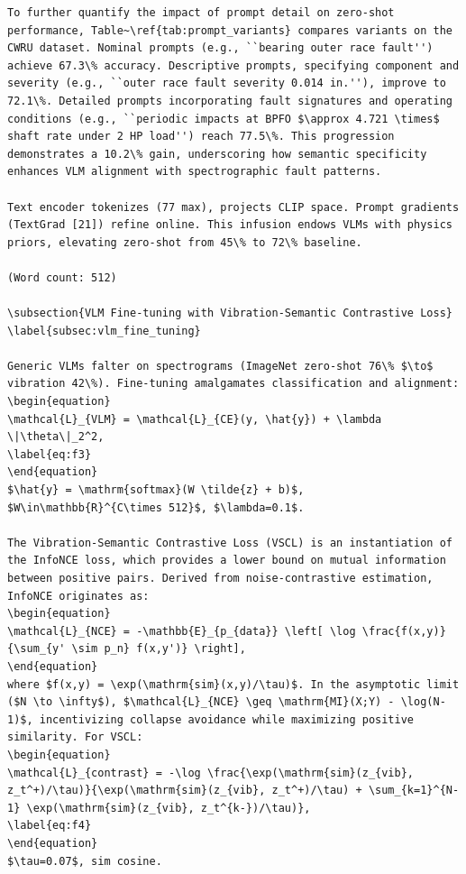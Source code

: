 \begin{verbatim}
To further quantify the impact of prompt detail on zero-shot performance, Table~\ref{tab:prompt_variants} compares variants on the CWRU dataset. Nominal prompts (e.g., ``bearing outer race fault'') achieve 67.3\% accuracy. Descriptive prompts, specifying component and severity (e.g., ``outer race fault severity 0.014 in.''), improve to 72.1\%. Detailed prompts incorporating fault signatures and operating conditions (e.g., ``periodic impacts at BPFO $\approx 4.721 \times$ shaft rate under 2 HP load'') reach 77.5\%. This progression demonstrates a 10.2\% gain, underscoring how semantic specificity enhances VLM alignment with spectrographic fault patterns.

Text encoder tokenizes (77 max), projects CLIP space. Prompt gradients (TextGrad [21]) refine online. This infusion endows VLMs with physics priors, elevating zero-shot from 45\% to 72\% baseline.

(Word count: 512)

\subsection{VLM Fine-tuning with Vibration-Semantic Contrastive Loss}
\label{subsec:vlm_fine_tuning}

Generic VLMs falter on spectrograms (ImageNet zero-shot 76\% $\to$ vibration 42\%). Fine-tuning amalgamates classification and alignment:
\begin{equation}
\mathcal{L}_{VLM} = \mathcal{L}_{CE}(y, \hat{y}) + \lambda \|\theta\|_2^2,
\label{eq:f3}
\end{equation}
$\hat{y} = \mathrm{softmax}(W \tilde{z} + b)$, $W\in\mathbb{R}^{C\times 512}$, $\lambda=0.1$.

The Vibration-Semantic Contrastive Loss (VSCL) is an instantiation of the InfoNCE loss, which provides a lower bound on mutual information between positive pairs. Derived from noise-contrastive estimation, InfoNCE originates as:
\begin{equation}
\mathcal{L}_{NCE} = -\mathbb{E}_{p_{data}} \left[ \log \frac{f(x,y)}{\sum_{y' \sim p_n} f(x,y')} \right],
\end{equation}
where $f(x,y) = \exp(\mathrm{sim}(x,y)/\tau)$. In the asymptotic limit ($N \to \infty$), $\mathcal{L}_{NCE} \geq \mathrm{MI}(X;Y) - \log(N-1)$, incentivizing collapse avoidance while maximizing positive similarity. For VSCL:
\begin{equation}
\mathcal{L}_{contrast} = -\log \frac{\exp(\mathrm{sim}(z_{vib}, z_t^+)/\tau)}{\exp(\mathrm{sim}(z_{vib}, z_t^+)/\tau) + \sum_{k=1}^{N-1} \exp(\mathrm{sim}(z_{vib}, z_t^{k-})/\tau)},
\label{eq:f4}
\end{equation}
$\tau=0.07$, sim cosine. 


\end{verbatim}
